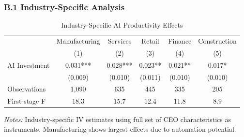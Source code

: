 \documentclass[12pt]{article}
\begin{document}
\subsubsection*{B.1 Industry-Specific Analysis}

\begin{table}[H]
\centering
\caption{Industry-Specific AI Productivity Effects}
\label{tab:industry_analysis}
\begin{tabular}{lccccc}
\toprule
 & Manufacturing & Services & Retail & Finance & Construction \\
 & (1) & (2) & (3) & (4) & (5) \\
\midrule
AI Investment & 0.031*** & 0.028*** & 0.023** & 0.021** & 0.017* \\
 & (0.009) & (0.010) & (0.011) & (0.010) & (0.010) \\
\midrule
Observations & 1,090 & 635 & 445 & 335 & 205 \\
First-stage F & 18.3 & 15.7 & 12.4 & 11.8 & 8.9 \\
\bottomrule
\end{tabular}
\begin{minipage}{\textwidth}
\footnotesize
\textit{Notes:} Industry-specific IV estimates using full set of CEO characteristics as instruments. Manufacturing shows largest effects due to automation potential.
\end{minipage}
\end{table}
\end{document}

